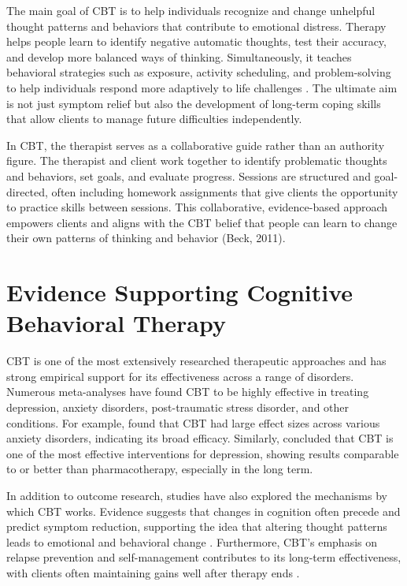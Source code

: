 \documentclass[stu]{apa7}
\begin{document}
The main goal of CBT is to help individuals recognize and change unhelpful thought patterns and behaviors that contribute to emotional distress. Therapy helps people learn to identify negative automatic thoughts, test their accuracy, and develop more balanced ways of thinking. Simultaneously, it teaches behavioral strategies such as exposure, activity scheduling, and problem-solving to help individuals respond more adaptively to life challenges \parencite{dobson2018evidence}. The ultimate aim is not just symptom relief but also the development of long-term coping skills that allow clients to manage future difficulties independently.

In CBT, the therapist serves as a collaborative guide rather than an authority figure. The therapist and client work together to identify problematic thoughts and behaviors, set goals, and evaluate progress. Sessions are structured and goal-directed, often including homework assignments that give clients the opportunity to practice skills between sessions. This collaborative, evidence-based approach empowers clients and aligns with the CBT belief that people can learn to change their own patterns of thinking and behavior (Beck, 2011).

\section{Evidence Supporting Cognitive Behavioral Therapy}

CBT is one of the most extensively researched therapeutic approaches and has strong empirical support for its effectiveness across a range of disorders. Numerous meta-analyses have found CBT to be highly effective in treating depression, anxiety disorders, post-traumatic stress disorder, and other conditions. For example, \textcite{hofmann2012efficacy} found that CBT had large effect sizes across various anxiety disorders, indicating its broad efficacy. Similarly, \textcite{cuijpers2008psychotherapy} concluded that CBT is one of the most effective interventions for depression, showing results comparable to or better than pharmacotherapy, especially in the long term.

In addition to outcome research, studies have also explored the mechanisms by which CBT works. Evidence suggests that changes in cognition often precede and predict symptom reduction, supporting the idea that altering thought patterns leads to emotional and behavioral change \parencite{stober2001worry}. Furthermore, CBT’s emphasis on relapse prevention and self-management contributes to its long-term effectiveness, with clients often maintaining gains well after therapy ends \parencite{hollon2006enduring}.
\end{document}
